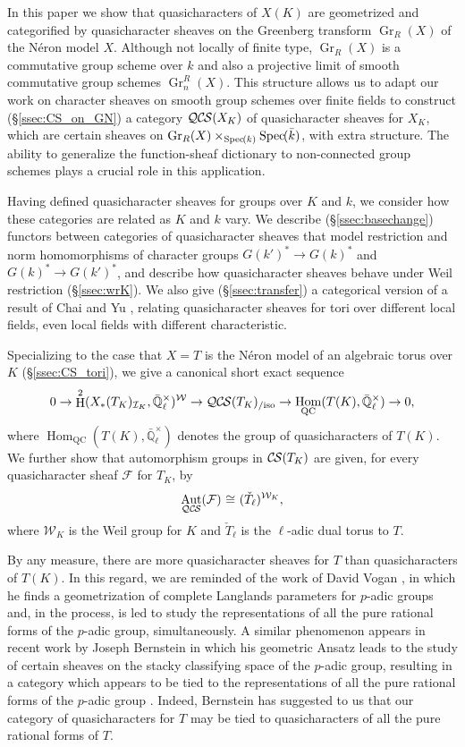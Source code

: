 \documentclass[10pt]{amsart}
\theoremstyle{plain}
\theoremstyle{definition}
\theoremstyle{remark}
\newcommand{\EE}{\mathbb{\bar Q}_\ell}
\newcommand{\bFq}{\bar{k}}
\newcommand{\Fq}{k}
\newcommand{\EEx}{\EE^\times}
\newcommand{\Weil}[1]{\mathcal{W}_{#1}}
\DeclareMathOperator{\Aut}{Aut}
\DeclareMathOperator{\Hom}{Hom}
\DeclareMathOperator{\Gr}{Gr}
\DeclareMathOperator{\Hh}{H}
\newcommand{\Spec}[1]{{\operatorname{Spec}\hskip-1pt( #1 )}}
\newcommand{\iso}{{\ \cong\ }}
\newcommand{\cs}[1]{{\mathcal{#1}}}
\newcommand{\CS}{{\mathcal{C\hskip-0.8pt S}}}
\newcommand{\QCS}{{\mathcal{QC\hskip-0.8pt S}}}
\newcommand{\QCSiso}[1]{\QCS(#1)_{/\text{iso}}}
\begin{document}
In this paper we show that quasicharacters of $X(K)$ are geometrized and categorified by quasicharacter sheaves on the
Greenberg transform $\Gr_R(X)$ of the N\'eron model $X$.
Although not locally of finite type, $\Gr_R(X)$ is a commutative group scheme over $\Fq$ and also a projective limit of smooth commutative group schemes $\Gr^R_n(X)$.
This structure allows us to adapt our work on character sheaves on smooth group schemes over finite fields to construct (\S\ref{ssec:CS_on_GN}) a category $\QCS(X_K)$
of quasicharacter sheaves for $X_K$, which are certain sheaves on $\Gr_R(X)\times_{\Spec{\Fq}} \Spec{\bFq}$, with extra structure.
The ability to generalize the function-sheaf dictionary to non-connected group schemes plays a crucial role in this application.

Having defined quasicharacter sheaves for groups over $K$ and $\Fq$, we consider how
these categories are related as $K$ and $\Fq$ vary.  We describe (\S\ref{ssec:basechange}) functors between categories
of quasicharacter sheaves that model restriction and norm homomorphisms of character groups $G(k')^* \to G(k)^*$ and $G(k)^* \to G(k')^*$,
and describe how quasicharacter sheaves behave under Weil restriction (\S\ref{ssec:wrK}).  We also give (\S\ref{ssec:transfer})
a categorical version of a result of Chai and Yu \cite{chai-yu:01a},
relating quasicharacter sheaves for tori over different local fields, even local fields
with different characteristic.

Specializing to the case that $X = T$ is the N\'eron model of an algebraic torus over $K$ (\S\ref{ssec:CS_tori}), 
we give a canonical short exact sequence 
\[
0 \to \Hh^2(X_*(T_K)_{\mathcal{I}_K},\EEx)^{\Weil{}} \to \QCSiso{T_K} \to \Hom_\text{QC}(T(K),\EEx) \to 0,
\]
where $\Hom_\text{QC}(T(K),\EEx)$ denotes the group of quasicharacters of $T(K)$.
We further show that automorphism groups in $\CS(T_K)$ are given, for every quasicharacter sheaf $\cs{F}$ for $T_K$, by
\[
\Aut_{\QCS{}}(\cs{F}) \iso (\check{T}_\ell)^{\Weil{K}},
\]
where $\Weil{K}$ is the Weil group for $K$ and $\check{T}_\ell$ is the $\ell$-adic dual torus to $T$.

By any measure, there are more quasicharacter sheaves for $T$ than quasicharacters of $T(K)$.  
In this regard, we are reminded of the work of David Vogan \cite{vogan:93a}, in which he finds a geometrization of complete Langlands parameters for $p$-adic groups 
and, in the process, is led to study the representations of all the pure rational forms of the $p$-adic group, simultaneously.
A similar phenomenon appears in recent work by Joseph Bernstein in which his geometric Ansatz leads to the study of certain sheaves on the stacky classifying space of the $p$-adic group, resulting in a category which appears to be tied to the representations of all the pure rational forms of the $p$-adic group \cite{bernstein:vogan_conference}.
Indeed, Bernstein has suggested to us that our category of quasicharacters for $T$ may be tied to quasicharacters of all the pure rational forms of $T$.
\end{document}
